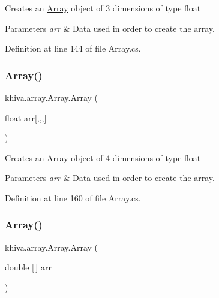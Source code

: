 Creates an \mbox{\hyperlink{classkhiva_1_1array_1_1_array}{Array}} object of 3 dimensions of type float 


\begin{DoxyParams}{Parameters}
{\em arr} & Data used in order to create the array.\\
\hline
\end{DoxyParams}


Definition at line 144 of file Array.\+cs.

\mbox{\label{classkhiva_1_1array_1_1_array_ac66e1423286505b97c30ff89bb9d52b6}} 
\subsubsection{\texorpdfstring{Array()}{Array()}\hspace{0.1cm}{\footnotesize\ttfamily [4/46]}}
{\footnotesize\ttfamily khiva.\+array.\+Array.\+Array (\begin{DoxyParamCaption}\item[{float}]{arr\mbox{[},,,\mbox{]} }\end{DoxyParamCaption})\hspace{0.3cm}{\ttfamily [inline]}}



Creates an \mbox{\hyperlink{classkhiva_1_1array_1_1_array}{Array}} object of 4 dimensions of type float 


\begin{DoxyParams}{Parameters}
{\em arr} & Data used in order to create the array.\\
\hline
\end{DoxyParams}


Definition at line 160 of file Array.\+cs.

\mbox{\label{classkhiva_1_1array_1_1_array_a8f470923dc4890df05558aac21f1a49c}} 
\subsubsection{\texorpdfstring{Array()}{Array()}\hspace{0.1cm}{\footnotesize\ttfamily [5/46]}}
{\footnotesize\ttfamily khiva.\+array.\+Array.\+Array (\begin{DoxyParamCaption}\item[{double \mbox{[}$\,$\mbox{]}}]{arr }\end{DoxyParamCaption})\hspace{0.3cm}{\ttfamily [inline]}}



